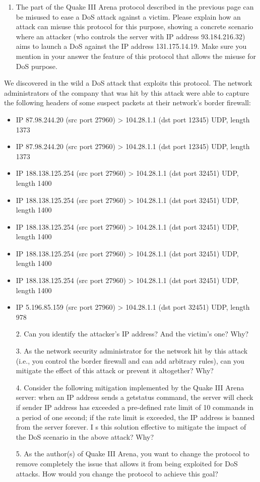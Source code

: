 \begin{enumerate}
    \item The part of the Quake III Arena protocol described in the previous page can be misused to ease a DoS attack against a victim. 
        Please explain how an attack can misuse this protocol for this purpose, showing a concrete scenario where an attacker (who controls the server with IP address 93.184.216.32) aims to launch a DoS against the IP address 131.175.14.19. 
        Make sure you mention in your answer the feature of this protocol that allows the misuse for DoS purpose.
\end{enumerate}
We discovered in the wild a DoS attack that exploits this protocol. 
The network administrators of the company that was hit by this attack were able to capture the following headers of some suspect packets at their network's border firewall:
\begin{itemize}
    \item IP 87.98.244.20 (src port 27960) > 104.28.1.1 (dst port 12345) UDP, length 1373
    \item IP 87.98.244.20 (src port 27960) > 104.28.1.1 (dst port 12345) UDP, length 1373
    \item IP 188.138.125.254 (src port 27960) > 104.28.1.1 (dst port 32451) UDP, length 1400
    \item IP 188.138.125.254 (src port 27960) > 104.28.1.1 (dst port 32451) UDP, length 1400
    \item IP 188.138.125.254 (src port 27960) > 104.28.1.1 (dst port 32451) UDP, length 1400
    \item IP 188.138.125.254 (src port 27960) > 104.28.1.1 (dst port 32451) UDP, length 1400
    \item IP 188.138.125.254 (src port 27960) > 104.28.1.1 (dst port 32451) UDP, length 1400
    \item IP 5.196.85.159 (src port 27960) > 104.28.1.1 (dst port 32451) UDP, length 978
\end{itemize}
\begin{enumerate}
    \item [2. ] Can you identify the attacker's IP address? And the victim's one? Why?
    \item [3. ] As the network security administrator for the network hit by this attack (i.e., you control the border firewall and can add arbitrary rules), can you mitigate the effect of this attack or prevent it altogether? Why?
    \item [4. ] Consider the following mitigation implemented by the Quake III Arena server: when an IP address sends a getstatus command, the server will check if sender IP address has exceeded a pre-defined rate limit of 10 commands in a period of one second; if the rate limit is exceeded, the IP address is banned from the server forever.
    I   s this solution effective to mitigate the impact of the DoS scenario in the above attack? Why?
    \item [5. ] As the author(s) of Quake III Arena, you want to change the protocol to remove completely the issue that allows it from being exploited for DoS attacks. 
        How would you change the protocol to achieve this goal?
\end{enumerate}


